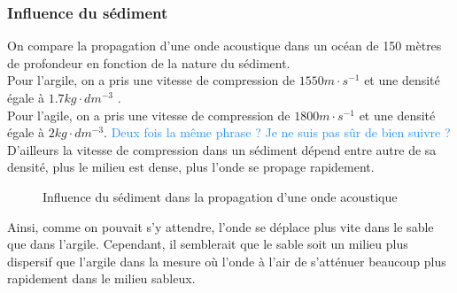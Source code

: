 \documentclass{rapportECC}
\newcommand{\FAadd}[1]{\textcolor{DodgerBlue}{{#1}}}                     %
\begin{document}
\subsubsection{Influence du sédiment}
On  compare la propagation d'une onde acoustique dans un océan de 150 mètres de profondeur en fonction de la nature du sédiment. \\
Pour l'argile, on a pris une vitesse de compression de $1550 m \cdot s^{-1}$ et une densité égale à $1.7 kg \cdot dm^{-3}$ .
\\
Pour l'agile, on a pris une vitesse de compression de $1800 m \cdot s^{-1}$ et une densité égale à $2 kg \cdot dm^{-3}$. \FAadd{Deux fois la même phrase ? Je ne suis pas sûr de bien suivre ?}\\
D'ailleurs la vitesse de compression dans un sédiment dépend entre autre de sa densité, plus le milieu est dense, plus l'onde se propage rapidement.
\begin{figure}[H]
    \centering
    \label{fig:image1}\hfill
    \caption{Influence du sédiment dans la propagation d'une onde acoustique}
    \label{fig:images_cote_a_cote}
\end{figure}
Ainsi, comme on pouvait s'y attendre, l'onde se déplace plus vite dans le sable que dans l'argile. Cependant, il semblerait que le sable soit un milieu plus dispersif que l'argile dans la mesure où l'onde à l'air de s'atténuer beaucoup plus rapidement dans le milieu sableux.
\end{document}
